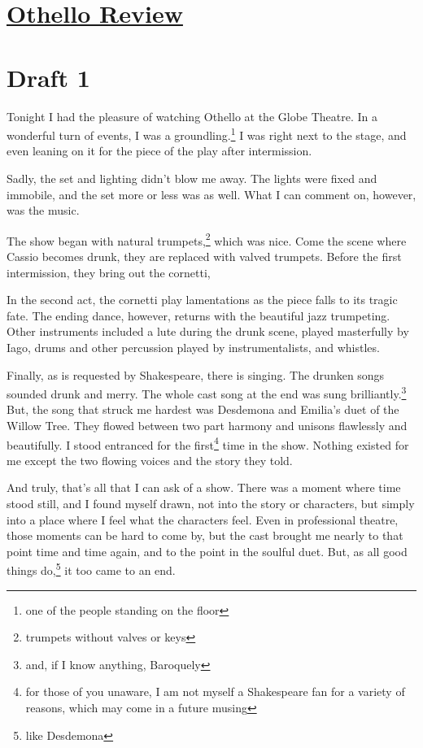 \documentclass[12pt]{article}[titlepage]
\newcommand{\1}{\={a}}
\newcommand{\2}{\={e}}
\newcommand{\3}{\={\i}}
\newcommand{\4}{\=o}
\newcommand{\5}{\=u}
\newcommand{\6}{\={A}}
\renewcommand{\,}{\textsuperscript{,}}
\begin{document}
\doublespacing
\section{\href{othello.html}{Othello Review}}
\section{Draft 1}
Tonight I had the pleasure of watching Othello at the Globe Theatre.
In a wonderful turn of events, I was a groundling.\footnote{one of the people standing on the floor}
I was right next to the stage, and even leaning on it for the piece of the play after intermission.

Sadly, the set and lighting didn’t blow me away.
The lights were fixed and immobile, and the set more or less was as well.
What I can comment on, however, was the music.

The show began with natural trumpets,\footnote{trumpets without valves or keys} which was nice.
Come the scene where Cassio becomes drunk, they are replaced with valved trumpets.
Before the first intermission, they bring out the cornetti,

In the second act, the cornetti play lamentations as the piece falls to its tragic fate.
The ending dance, however, returns with the beautiful jazz trumpeting.
Other instruments included a lute during the drunk scene, played masterfully by Iago, drums and other percussion played by instrumentalists, and whistles.

Finally, as is requested by Shakespeare, there is singing.
The drunken songs sounded drunk and merry.
The whole cast song at the end was sung brilliantly.\footnote{and, if I know anything, Baroquely}
But, the song that struck me hardest was Desdemona and Emilia’s duet of the Willow Tree.
They flowed between two part harmony and unisons flawlessly and beautifully.
I stood entranced for the first\footnote{for those of you unaware, I am not myself a Shakespeare fan for a variety of reasons, which may come in a future musing} time in the show.
Nothing existed for me except the two flowing voices and the story they told.

And truly, that’s all that I can ask of a show.
There was a moment where time stood still, and I found myself drawn, not into the story or characters, but simply into a place where I feel what the characters feel.
Even in professional theatre, those moments can be hard to come by, but the cast brought me nearly to that point time and time again, and to the point in the soulful duet.
But, as all good things do,\footnote{like Desdemona} it too came to an end.
\end{document}
